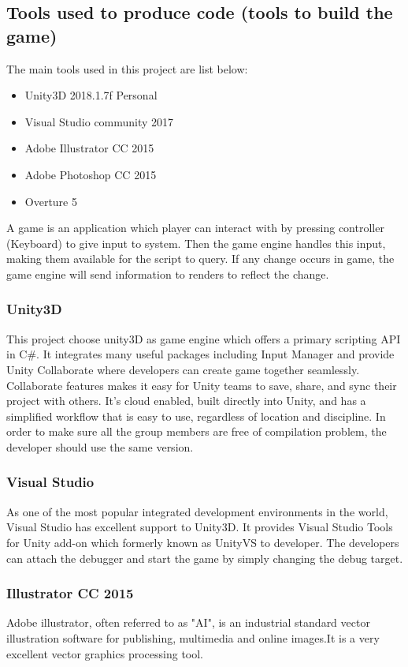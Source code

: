 \documentclass[12pt]{article}
\begin{document}
\subsection{Tools used to produce code (tools to build the game)}
The main tools used in this project are list below:
\begin{itemize}
\item Unity3D 2018.1.7f Personal
\item Visual Studio community 2017
\item Adobe Illustrator CC 2015
\item Adobe Photoshop CC 2015
\item Overture 5
\end{itemize}
A game is an application which player can interact with by pressing controller (Keyboard) to give input to system. Then the game engine handles this input, making them available for the script to query. If any change occurs in game, the game engine will send information to renders to reflect the change.
 
\subsubsection{Unity3D}
This project choose unity3D as game engine which offers a primary scripting API in C\#. It integrates many useful packages including Input Manager and provide Unity Collaborate where developers can create game together seamlessly. Collaborate features makes it easy for Unity teams to save, share, and sync their project with others. It’s cloud enabled, built directly into Unity, and has a simplified workflow that is easy to use, regardless of location and discipline. In order to make sure all the group members are free of compilation problem, the developer should use the same version.

\subsubsection{Visual Studio} 
As one of the most popular integrated development environments in the world, Visual Studio has excellent support to Unity3D. It provides Visual Studio Tools for Unity add-on which formerly known as UnityVS to developer. The developers can attach the debugger and start the game by simply changing the debug target.

\subsubsection{Illustrator CC 2015}
Adobe illustrator, often referred to as "AI", is an industrial standard vector illustration software for publishing, multimedia and online images.It is a very excellent vector graphics processing tool.
\end{document}
